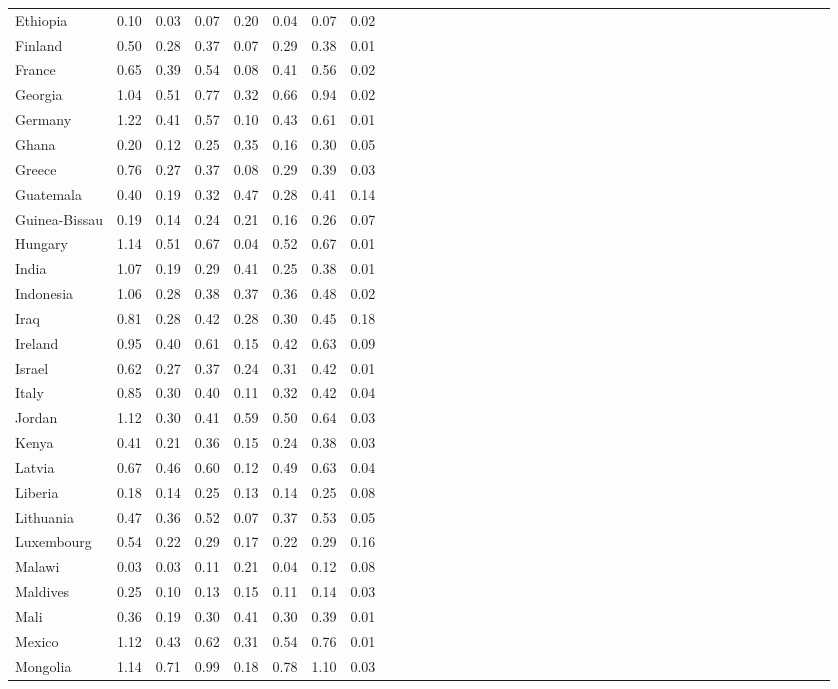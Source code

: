 \begin{ThreePartTable}
\begin{longtable}[t]{l|r|rrrl|r|rrrl|r|rrrl|r|rrrl|r|rrrl|r|rrrl|r|rrrl|r|rrr}
Ethiopia & 0.10 & 0.03 & 0.07 & 0.20 & 0.04 & 0.07 & 0.02\\
Finland & 0.50 & 0.28 & 0.37 & 0.07 & 0.29 & 0.38 & 0.01\\
France & 0.65 & 0.39 & 0.54 & 0.08 & 0.41 & 0.56 & 0.02\\
Georgia & 1.04 & 0.51 & 0.77 & 0.32 & 0.66 & 0.94 & 0.02\\
Germany & 1.22 & 0.41 & 0.57 & 0.10 & 0.43 & 0.61 & 0.01\\
Ghana & 0.20 & 0.12 & 0.25 & 0.35 & 0.16 & 0.30 & 0.05\\
Greece & 0.76 & 0.27 & 0.37 & 0.08 & 0.29 & 0.39 & 0.03\\
Guatemala & 0.40 & 0.19 & 0.32 & 0.47 & 0.28 & 0.41 & 0.14\\
Guinea-Bissau & 0.19 & 0.14 & 0.24 & 0.21 & 0.16 & 0.26 & 0.07\\
Hungary & 1.14 & 0.51 & 0.67 & 0.04 & 0.52 & 0.67 & 0.01\\
India & 1.07 & 0.19 & 0.29 & 0.41 & 0.25 & 0.38 & 0.01\\
Indonesia & 1.06 & 0.28 & 0.38 & 0.37 & 0.36 & 0.48 & 0.02\\
Iraq & 0.81 & 0.28 & 0.42 & 0.28 & 0.30 & 0.45 & 0.18\\
Ireland & 0.95 & 0.40 & 0.61 & 0.15 & 0.42 & 0.63 & 0.09\\
Israel & 0.62 & 0.27 & 0.37 & 0.24 & 0.31 & 0.42 & 0.01\\
Italy & 0.85 & 0.30 & 0.40 & 0.11 & 0.32 & 0.42 & 0.04\\
Jordan & 1.12 & 0.30 & 0.41 & 0.59 & 0.50 & 0.64 & 0.03\\
Kenya & 0.41 & 0.21 & 0.36 & 0.15 & 0.24 & 0.38 & 0.03\\
Latvia & 0.67 & 0.46 & 0.60 & 0.12 & 0.49 & 0.63 & 0.04\\
Liberia & 0.18 & 0.14 & 0.25 & 0.13 & 0.14 & 0.25 & 0.08\\
Lithuania & 0.47 & 0.36 & 0.52 & 0.07 & 0.37 & 0.53 & 0.05\\
Luxembourg & 0.54 & 0.22 & 0.29 & 0.17 & 0.22 & 0.29 & 0.16\\
Malawi & 0.03 & 0.03 & 0.11 & 0.21 & 0.04 & 0.12 & 0.08\\
Maldives & 0.25 & 0.10 & 0.13 & 0.15 & 0.11 & 0.14 & 0.03\\
Mali & 0.36 & 0.19 & 0.30 & 0.41 & 0.30 & 0.39 & 0.01\\
Mexico & 1.12 & 0.43 & 0.62 & 0.31 & 0.54 & 0.76 & 0.01\\
Mongolia & 1.14 & 0.71 & 0.99 & 0.18 & 0.78 & 1.10 & 0.03\\

\end{longtable}
\end{ThreePartTable}
